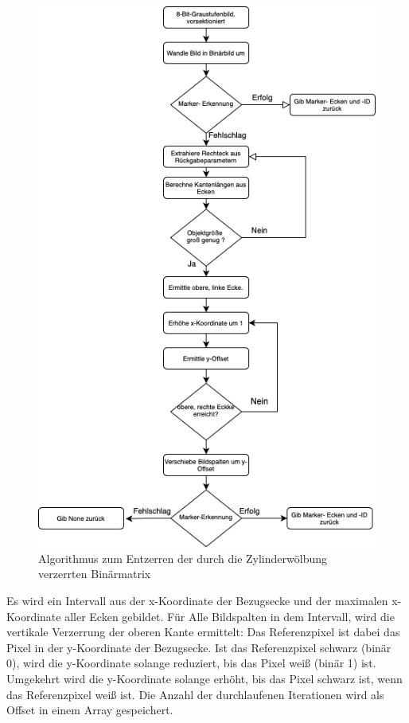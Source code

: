     \begin{figure}
        \caption[Entzerralgorithmus]{Algorithmus zum Entzerren der durch die Zylinderwölbung verzerrten Binärmatrix}\label{fig:figure28}
        \includegraphics[width = \textwidth]{Bilder/algo.drawio.png}
        \centering
    \end{figure}

    Es wird ein Intervall aus der x-Koordinate der Bezugsecke und der maximalen x-Koordinate aller Ecken gebildet.
    Für Alle Bildspalten in dem Intervall, wird die vertikale Verzerrung der oberen Kante ermittelt:
    Das Referenzpixel ist dabei das Pixel in der y-Koordinate der Bezugsecke.
    Ist das Referenzpixel schwarz (binär 0), wird die y-Koordinate solange reduziert, bis das Pixel weiß (binär 1) ist.
    Umgekehrt wird die y-Koordinate solange erhöht, bis das Pixel schwarz ist, wenn das Referenzpixel weiß ist.
    Die Anzahl der durchlaufenen Iterationen wird als Offset in einem Array gespeichert. 

